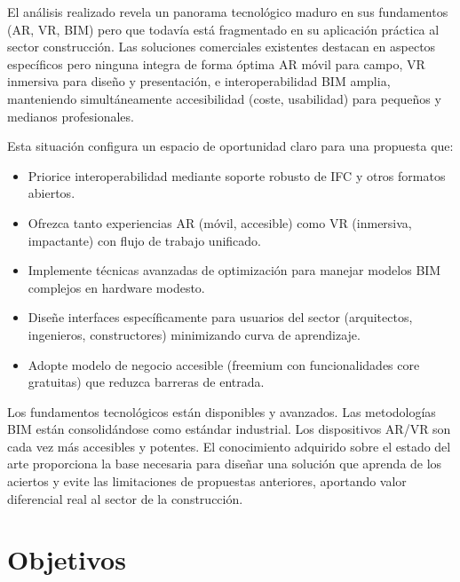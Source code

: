 El análisis realizado revela un panorama tecnológico maduro en sus fundamentos (AR, VR, BIM) pero que todavía está fragmentado en su aplicación práctica al sector construcción. Las soluciones comerciales existentes destacan en aspectos específicos pero ninguna integra de forma óptima AR móvil para campo, VR inmersiva para diseño y presentación, e interoperabilidad BIM amplia, manteniendo simultáneamente accesibilidad (coste, usabilidad) para pequeños y medianos profesionales.

Esta situación configura un espacio de oportunidad claro para una propuesta que:
\begin{itemize}

\item Priorice interoperabilidad mediante soporte robusto de IFC y otros formatos abiertos.
\item Ofrezca tanto experiencias AR (móvil, accesible) como VR (inmersiva, impactante) con flujo de trabajo unificado.
\item Implemente técnicas avanzadas de optimización para manejar modelos BIM complejos en hardware modesto.
\item Diseñe interfaces específicamente para usuarios del sector (arquitectos, ingenieros, constructores) minimizando curva de aprendizaje.
\item Adopte modelo de negocio accesible (freemium con funcionalidades core gratuitas) que reduzca barreras de entrada.
\end{itemize}

Los fundamentos tecnológicos están disponibles y avanzados. Las metodologías BIM están consolidándose como estándar industrial. Los dispositivos AR/VR son cada vez más accesibles y potentes. El conocimiento adquirido sobre el estado del arte proporciona la base necesaria para diseñar una solución que aprenda de los aciertos y evite las limitaciones de propuestas anteriores, aportando valor diferencial real al sector de la construcción.


















\chapter{\label{objetivos}Objetivos}

